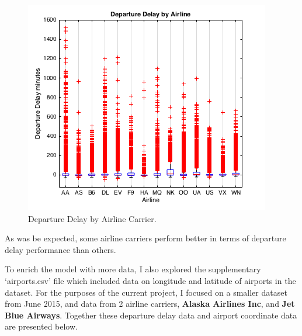 \documentclass[a4paper, 10pt]{article}
\begin{document}
\begin{figure}[H]
\begin{center}
\includegraphics[scale=0.5]{departureDelayByAirline}
\caption{Departure Delay by Airline Carrier.}
\label{departureDelayByAirline}
\end{center}
\end{figure}

As was be expected, some airline carriers perform better in terms of departure delay performance than others.

\clearpage
To enrich the model with more data, I also explored the supplementary `airports.csv' file which included data on longitude and latitude of airports in the dataset. For the purposes of the current project, I focused on a smaller dataset from June 2015, and data from 2 airline carriers, \textbf{Alaska Airlines Inc}, and \textbf{Jet Blue Airways}. Together these departure delay data and airport coordinate data are presented below.
\end{document}
